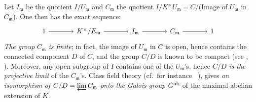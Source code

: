 Let $I_{\mathfrak{m}}$ be the quotient
$I/U_{\mathfrak{m}}$ and $C_{\mathfrak{m}}$ the
quotient $I/K^\times U_{\mathfrak{m}} = C/$(Image of $U_{\mathfrak{m}}$ in
$C_{\mathfrak{m}}$). One then has the exact sequence:
\[\begin{tikzcd}[sep=large]
	1 \rar & K^\times/E_{\mathfrak{m}} \rar & I_{\mathfrak{m}} \rar &
	C_{\mathfrak{m}} \rar & 1
\end{tikzcd}\]
\emph{The group $C_{\mathfrak{m}}$ is finite}; in fact, the image of
$U_{\mathfrak{m}}$ in $C$ is open, hence contains the connected component
$D$ of $C$, and the group $C/D$ is known to be compact (see
\cite{13}, \cite{44}).  Moreover, any open subgroup of $I$ contains one of the
$U_{\mathfrak{m}}$'s, hence \emph{$C/D$ is the projective limit} of the
$C_{\mathfrak{m}}$'s. Class field theory (cf.\ for instance
\citeauthor{6}~\cite{6}), gives \emph{an isomorphism of $C/D = \varprojlim
C_{\mathfrak{m}}$ onto the Galois group $G^{\mathrm{ab}}$} of the maximal abelian
extension of $K$.

